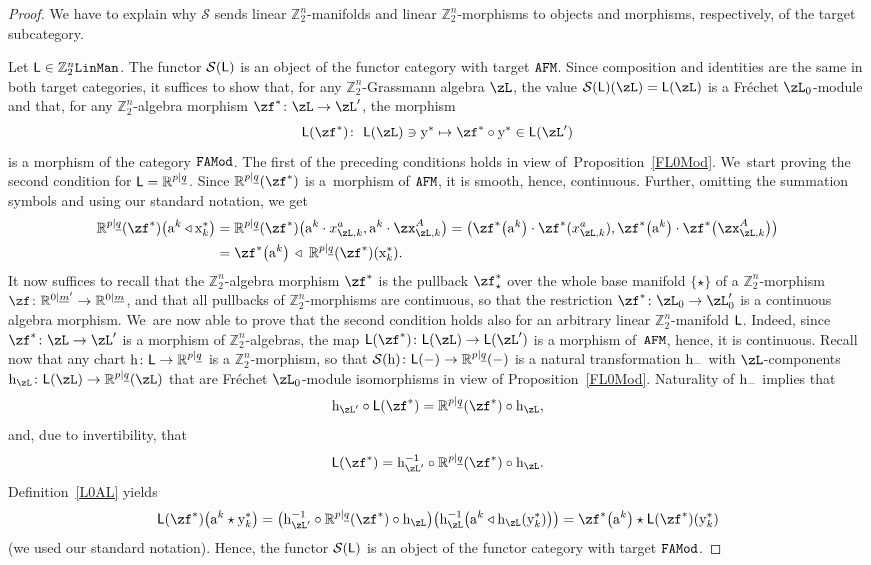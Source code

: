 \documentclass[pdftex]{sigma}%
\newcommand{\R}{{\mathbb R}}
\newcommand{\Z}{{\mathbb Z}}
\def\ul{\underline}
\def\ul{\underline}
\newcommand{\0}{\otimes}
\newcommand{\z}{\Z_2^n}
\numberwithin{equation}{section}
\begin{document}
\begin{proof}
We have to explain why $\mathcal{S}$ sends linear $\z$-manifolds and linear $\z$-morphisms to objects and morphisms, respectively, of the target subcategory.

Let ${\sf L}\in\z{\tt LinMan}$. The functor $\mathcal{S}({\sf L})$ is an object of the functor category with target $\tt AFM$. Since composition and identities are the same in both target categories, it suffices to show that, for any $\z$-Grassmann algebra $\zL$, the value $\mathcal{S}({\sf L})(\zL)={\sf L}(\zL)$ is a Fr\'echet $\zL_0$-module and that, for any $\z$-algebra morphism $\zf^*\colon \zL\to \zL'$, the morphism
\[
{\sf L}(\zf^*)\colon\ {\sf L}(\zL)\ni {\rm y}^*\mapsto \zf^*\circ{\rm y}^*\in {\sf L}(\zL')
\]
is a morphism of the category $\tt FAMod$. The first of the preceding conditions holds in view of~Pro\-position~\ref{FL0Mod}. We~start proving the second condition for ${\sf L}=\R^{p|\ul q}$. Since $\R^{p|\ul q}(\zf^*)$ is a~mor\-phism of $\tt AFM$, it is smooth, hence, continuous. Further, omitting the summation symbols and using our standard notation, we get
\begin{align*}
\R^{p|\ul q}(\zf^*)\big({\rm a}^k \triangleleft{\rm x}_k^*\big)& =\R^{p|\ul q}(\zf^*)\big({\rm a}^k\cdot x_{\zL,k}^a,{\rm a}^k\cdot\zx_{\zL,k}^A\big)=\big(\zf^*\big({\rm a}^k\big)\cdot \zf^*(x_{\zL,k}^a),\zf^*\big({\rm a}^k\big)\cdot\zf^*\big(\zx_{\zL,k}^A\big)\big)\nonumber\\
 & = \zf^*\big({\rm a}^k\big)\,\triangleleft\;\R^{p|\ul q}(\zf^*)({\rm x}^*_k) .%
\end{align*}
It now suffices to recall that the $\z$-algebra morphism $\zf^*$ is the pullback $\zf^*_{\star}$ over the whole base manifold $\{\star\}$ of a $\z$-morphism $\zf\colon \R^{0|\ul m'}\to \R^{0|\ul m}$, and that all pullbacks of $\z$-morphisms are continuous, so that the restriction $\zf^*\colon \zL_0\to\zL'_0$ is a continuous algebra morphism. We~are now able to prove that the second condition holds also for an arbitrary linear $\z$-manifold $\sf L$. Indeed, since $\zf^*\colon \zL\to \zL'$ is a morphism of $\z$-algebras, the map ${\sf L}(\zf^*)\colon {\sf L}(\zL)\to {\sf L}(\zL')$ is a morphism of~$\tt AFM$, hence, it is continuous. Recall now that any chart ${\rm h}\colon {\sf L}\to \R^{p|\ul q}$ is a $\z$-morphism, so that $\mathcal{S}({\rm h})\colon {\sf L}(-)\to \R^{p|\ul q}(-)$ is a natural transformation ${\rm h}_-$ with $\zL$-components ${\rm h}_\zL\colon {\sf L}(\zL)\to\R^{p|\ul q}(\zL)$ that are Fr\'echet $\zL_0$-module isomorphisms in view of Proposition~\ref{FL0Mod}. Naturality of ${\rm h}_-$ implies that
\[
{\rm h}_{\zL'}\circ{\sf L}(\zf^*)=\R^{p|\ul q}(\zf^*)\circ {\rm h}_\zL,
\]
and, due to invertibility, that
\[
{\sf L}(\zf^*)={\rm h}_{\zL'}^{-1}\circ\R^{p|\ul q}(\zf^*)\circ {\rm h}_\zL.
\]
Definition~\eqref{L0AL} yields
\[
{\sf L}(\zf^*)\big({\rm a}^k\star {\rm y}^*_k\big)=\big({\rm h}_{\zL'}^{-1}\circ\R^{p|\ul q}(\zf^*)\circ {\rm h}_\zL\big)\big({\rm h}_\zL^{-1}\big({\rm a}^k\triangleleft {\rm h}_\zL({\rm y}^*_k)\big)\big)=\zf^*\big({\rm a}^k\big)\star{\sf L}(\zf^*)({\rm y}^*_k)
\]
(we used our standard notation). Hence, the functor $\mathcal{S}({\sf L})$ is an object of the functor category with target $\tt FAMod$.


\end{proof}
\end{document}

